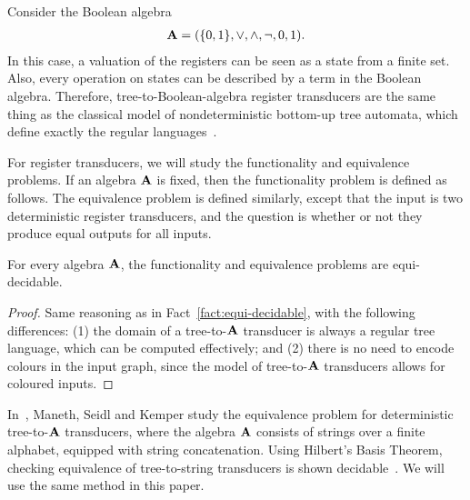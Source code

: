 \begin{example}
    Consider the  Boolean algebra
    \begin{align*}
    \mathbf{A} = (\{0,1\},\lor, \land, \neg, 0, 1).
    \end{align*}
    In this case, a valuation of the registers can be seen as a state from a finite set. Also, every operation on states can be described  by a term in the Boolean algebra. Therefore, tree-to-Boolean-algebra register transducers are the same thing as the classical model of nondeterministic bottom-up tree automata, which define exactly the regular languages~\cite[Section 2]{thatcherGeneralizedFiniteAutomata1968}. 
\end{example}

For register transducers, we will study the functionality and equivalence problems. If an algebra $\mathbf{A}$ is fixed, then the functionality problem is defined as follows.
The equivalence problem is defined similarly, except that the input is two deterministic register transducers, and the question is whether or not they produce equal outputs for all inputs. 
\begin{fact}
    For every algebra $\mathbf{A}$, the functionality and equivalence problems are equi-decidable.
\end{fact}
\begin{proof}
    Same reasoning as in Fact~\ref{fact:equi-decidable}, with the following differences: (1) the domain of a tree-to-$\mathbf{A}$ transducer is always a regular tree language, which can be computed effectively; and  (2) there is no need to encode colours in the input graph, since the model of tree-to-$\mathbf{A}$ transducers allows for coloured inputs.
\end{proof}

\begin{example} In~\cite{seidlManethKemper2018}, Maneth, Seidl and Kemper study  the equivalence problem for  deterministic tree-to-$\mathbf{A}$ transducers,  where  the algebra $\mathbf{A}$ consists of strings over a finite alphabet, equipped with string concatenation.  Using Hilbert's Basis Theorem, checking equivalence of tree-to-string transducers is shown decidable~\cite[Corollary 8.2]{seidlManethKemper2018}. We will use the same method in this paper.
\end{example}


